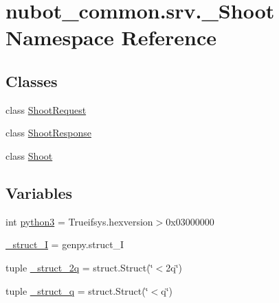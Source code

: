 \hypertarget{namespacenubot__common_1_1srv_1_1__Shoot}{\section{nubot\-\_\-common.\-srv.\-\_\-\-Shoot Namespace Reference}
\label{namespacenubot__common_1_1srv_1_1__Shoot}
}
\subsection*{Classes}
\begin{DoxyCompactItemize}
\item 
class \hyperlink{classnubot__common_1_1srv_1_1__Shoot_1_1ShootRequest}{Shoot\-Request}
\item 
class \hyperlink{classnubot__common_1_1srv_1_1__Shoot_1_1ShootResponse}{Shoot\-Response}
\item 
class \hyperlink{classnubot__common_1_1srv_1_1__Shoot_1_1Shoot}{Shoot}
\end{DoxyCompactItemize}
\subsection*{Variables}
\begin{DoxyCompactItemize}
\item 
int \hyperlink{namespacenubot__common_1_1srv_1_1__Shoot_a344b19f8d7fbcaefc496a25053316360}{python3} = Trueifsys.\-hexversion$>$0x03000000
\item 
\hyperlink{namespacenubot__common_1_1srv_1_1__Shoot_a9c5865df70832f1d7ba597991610b22a}{\-\_\-struct\-\_\-\-I} = genpy.\-struct\-\_\-\-I
\item 
tuple \hyperlink{namespacenubot__common_1_1srv_1_1__Shoot_a0e554cd32733a7381460d65aba94d4ce}{\-\_\-struct\-\_\-2q} = struct.\-Struct(\char`\"{}$<$2q\char`\"{})
\item 
tuple \hyperlink{namespacenubot__common_1_1srv_1_1__Shoot_ab9ca5ae6841b4905cc57179787e9b6e6}{\-\_\-struct\-\_\-q} = struct.\-Struct(\char`\"{}$<$q\char`\"{})
\end{DoxyCompactItemize}


